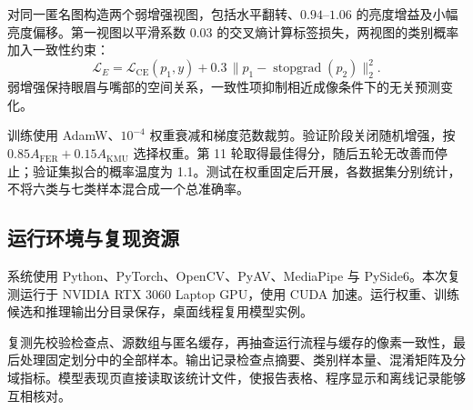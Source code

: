 对同一匿名图构造两个弱增强视图，包括水平翻转、$0.94$--$1.06$ 的亮度增益及小幅亮度偏移。第一视图以平滑系数 $0.03$ 的交叉熵计算标签损失，两视图的类别概率加入一致性约束：
\begin{equation}
\mathcal{L}_{E}=\mathcal{L}_{\mathrm{CE}}(p_1,y)+0.3\,\lVert p_1-\operatorname{stopgrad}(p_2)\rVert_2^2.
\end{equation}
弱增强保持眼眉与嘴部的空间关系，一致性项抑制相近成像条件下的无关预测变化。

训练使用 AdamW、$10^{-4}$ 权重衰减和梯度范数裁剪。验证阶段关闭随机增强，按 $0.85A_{\mathrm{FER}}+0.15A_{\mathrm{KMU}}$ 选择权重。第 11 轮取得最佳得分，随后五轮无改善而停止；验证集拟合的概率温度为 1.1。测试在权重固定后开展，各数据集分别统计，不将六类与七类样本混合成一个总准确率。

\subsection{运行环境与复现资源}
系统使用 Python、PyTorch、OpenCV、PyAV、MediaPipe 与 PySide6。本次复测运行于 NVIDIA RTX 3060 Laptop GPU，使用 CUDA 加速。运行权重、训练候选和推理输出分目录保存，桌面线程复用模型实例。

复测先校验检查点、源数组与匿名缓存，再抽查运行流程与缓存的像素一致性，最后处理固定划分中的全部样本。输出记录检查点摘要、类别样本量、混淆矩阵及分域指标。模型表现页直接读取该统计文件，使报告表格、程序显示和离线记录能够互相核对。
